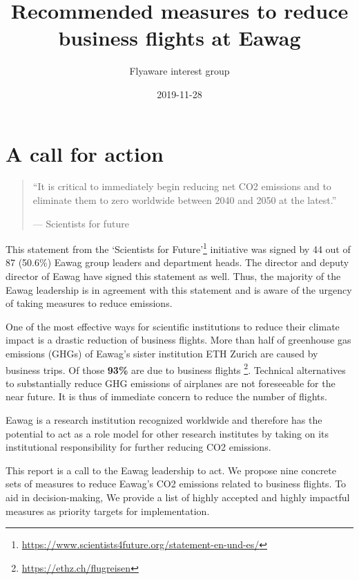 \documentclass[]{tufte-handout}
\title{Recommended measures to reduce business flights at Eawag}
\author{Flyaware interest group}
\date{2019-11-28}
\begin{document}
\maketitle




\hypertarget{a-call-for-action}{%
\section{A call for action}\label{a-call-for-action}}

\begin{quote}
``It is critical to immediately begin reducing net CO2 emissions and to
eliminate them to zero worldwide between 2040 and 2050 at the latest.''

\hfill --- Scientists for future
\end{quote}

This statement from the `Scientists for Future'\footnote{\url{https://www.scientists4future.org/statement-en-und-es/}}
initiative was signed by 44 out of 87 (50.6\%) Eawag group leaders and
department heads. The director and deputy director of Eawag have signed
this statement as well. Thus, the majority of the Eawag leadership is in
agreement with this statement and is aware of the urgency of taking
measures to reduce emissions.

One of the most effective ways for scientific institutions to reduce
their climate impact is a drastic reduction of business flights. More
than half of greenhouse gas emissions (GHGs) of Eawag's sister
institution ETH Zurich are caused by business trips. Of those
\textbf{93\%} are due to business flights \footnote{\url{https://ethz.ch/flugreisen}}.
Technical alternatives to substantially reduce GHG emissions of
airplanes are not foreseeable for the near future. It is thus of
immediate concern to reduce the number of flights.

Eawag is a research institution recognized worldwide and therefore has
the potential to act as a role model for other research institutes by
taking on its institutional responsibility for further reducing CO2
emissions.

This report is a call to the Eawag leadership to act. We propose nine
concrete sets of measures to reduce Eawag's CO2 emissions related to
business flights. To aid in decision-making, We provide a list of highly
accepted and highly impactful measures as priority targets for
implementation.
\end{document}
